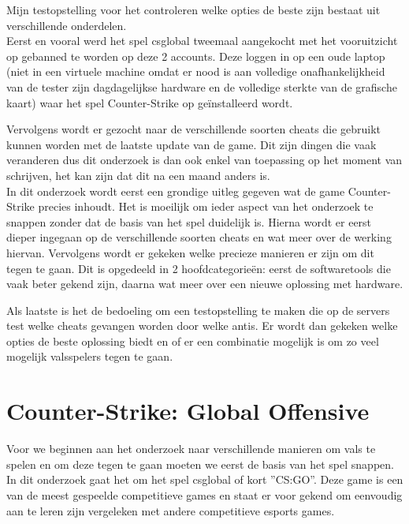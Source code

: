 \documentclass[pdftex,a4paper,12pt,twoside]{report}
\begin{document}
Mijn testopstelling voor het controleren welke opties de beste zijn bestaat uit verschillende onderdelen. 
\\

Eerst en vooral werd het spel \gls{csglobal} tweemaal aangekocht met het vooruitzicht op gebanned te worden op deze 2 accounts. Deze loggen in op een oude laptop (niet in een virtuele machine omdat er nood is aan volledige onafhankelijkheid van de tester zijn dagdagelijkse hardware en de volledige sterkte van de grafische kaart) waar het spel Counter-Strike op geïnstalleerd wordt. 

Vervolgens wordt er gezocht naar de verschillende soorten \gls{cheat}s die gebruikt kunnen worden met de laatste update van de game. Dit zijn dingen die vaak veranderen dus dit onderzoek is dan ook enkel van toepassing op het moment van schrijven, het kan zijn dat dit na een maand anders is.
\\

In dit onderzoek wordt eerst een grondige uitleg gegeven wat de game Counter-Strike precies inhoudt. Het is moeilijk om ieder aspect van het onderzoek te snappen zonder dat de basis van het spel duidelijk is. Hierna wordt er eerst dieper ingegaan op de verschillende soorten \gls{cheat}s en wat meer over de werking hiervan. Vervolgens wordt er gekeken welke precieze manieren er zijn om dit tegen te gaan. Dit is opgedeeld in 2 hoofdcategorieën: eerst de softwaretools die vaak beter gekend zijn, daarna wat meer over een nieuwe oplossing met hardware. 

\newpage
Als laatste is het de bedoeling om een testopstelling te maken die op de servers test welke \gls{cheat}s gevangen worden door welke \gls{anti}s. Er wordt dan gekeken welke opties de beste oplossing biedt en of er een combinatie mogelijk is om zo veel mogelijk valsspelers tegen te gaan. 


\chapter{Counter-Strike: Global Offensive}
\label{ch:csgo}
Voor we beginnen aan het onderzoek naar verschillende manieren om vals te spelen en om deze tegen te gaan moeten we eerst de basis van het spel snappen. In dit onderzoek gaat het om het spel \gls{csglobal} of kort ''CS:GO''. Deze game is een van de meest gespeelde competitieve games en staat er voor gekend om eenvoudig aan te leren zijn vergeleken met andere competitieve \gls{esports} games. 
\\
\end{document}

